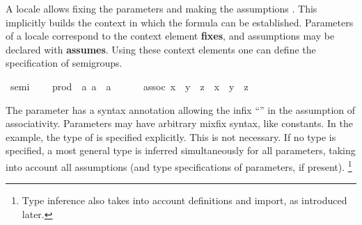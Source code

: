 \begin{isabellebody}
\begin{isamarkuptext}
  A locale allows fixing the parameters  and making the assumptions .  This implicitly builds the context in
  which the formula  can be established.
  Parameters of a locale correspond to the context element
  \textbf{fixes}, and assumptions may be declared with
  \textbf{assumes}.  Using these context elements one can define
  the specification of semigroups.%
\end{isamarkuptext}%
\isamarkuptrue%
\ semi\ {\isacharequal}\isanewline
\ \ \ prod\ {\isacharcolon}{\isacharcolon}\ {\isachardoublequote}{\isacharbrackleft}{\isacharprime}a{\isacharcomma}\ {\isacharprime}a{\isacharbrackright}\ {\isasymRightarrow}\ {\isacharprime}a{\isachardoublequote}\ {\isacharparenleft}\ {\isachardoublequote}{\isasymcdot}{\isachardoublequote}\ {}{}{\isacharparenright}\isanewline
\ \ \ assoc{\isacharcolon}\ {\isachardoublequote}{\isacharparenleft}x\ {\isasymcdot}\ y{\isacharparenright}\ {\isasymcdot}\ z\ {\isacharequal}\ x\ {\isasymcdot}\ {\isacharparenleft}y\ {\isasymcdot}\ z{\isacharparenright}{\isachardoublequote}\isamarkupfalse%
%
\begin{isamarkuptext}%
The parameter  has a
  syntax annotation allowing the infix ``\isa{{\isasymcdot}}'' in the
  assumption of associativity.  Parameters may have arbitrary mixfix
  syntax, like constants.  In the example, the type of  is
  specified explicitly.  This is not necessary.  If no type is
  specified, a most general type is inferred simultaneously for all
  parameters, taking into account all assumptions (and type
  specifications of parameters, if present).%
\footnote{Type inference also takes into account definitions and
  import, as introduced later.}


\end{isamarkuptext}
\end{isabellebody}
